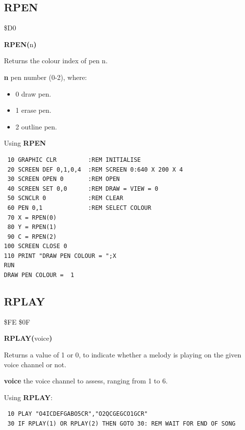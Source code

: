 \subsection{RPEN}
\begin{description}[leftmargin=2cm,style=nextline]
\item [Token:] \$D0
\item [Format:] {\bf RPEN(}n{\bf)}
\item [Usage:]  Returns the colour index of pen n.

                {\bf n} pen number (0-2), where:

                \begin{itemize}
                    \item {0} draw pen.
                    \item {1} erase pen.
                    \item {2} outline pen.
                \end{itemize}

\item [Example:] Using {\bf RPEN}

\begin{tcolorbox}[colback=black,coltext=white]
\verbatimfont{\codefont}
\begin{verbatim}
 10 GRAPHIC CLR         :REM INITIALISE
 20 SCREEN DEF 0,1,0,4  :REM SCREEN 0:640 X 200 X 4
 30 SCREEN OPEN 0       :REM OPEN
 40 SCREEN SET 0,0      :REM DRAW = VIEW = 0
 50 SCNCLR 0            :REM CLEAR
 60 PEN 0,1             :REM SELECT COLOUR
 70 X = RPEN(0)
 80 Y = RPEN(1)
 90 C = RPEN(2)
100 SCREEN CLOSE 0
110 PRINT "DRAW PEN COLOUR = ";X
RUN
DRAW PEN COLOUR =  1
\end{verbatim}
\end{tcolorbox}
\end{description}


\newpage
\subsection{RPLAY}
\begin{description}[leftmargin=2cm,style=nextline]
\item [Token:] \$FE \$0F
\item [Format:] {\bf RPLAY(}voice{\bf)}
\item [Usage:] Returns a value of 1 or 0, to indicate whether a melody is playing on the given voice channel or not.

               {\bf voice} the voice channel to assess, ranging from 1 to 6.

\item [Example:] Using {\bf RPLAY}:
\begin{tcolorbox}[colback=black,coltext=white]
\verbatimfont{\codefont}
\begin{verbatim}
 10 PLAY "O4ICDEFGABO5CR","O2QCGEGCO1GCR"
 30 IF RPLAY(1) OR RPLAY(2) THEN GOTO 30: REM WAIT FOR END OF SONG
\end{verbatim}
\end{tcolorbox}
\end{description}

